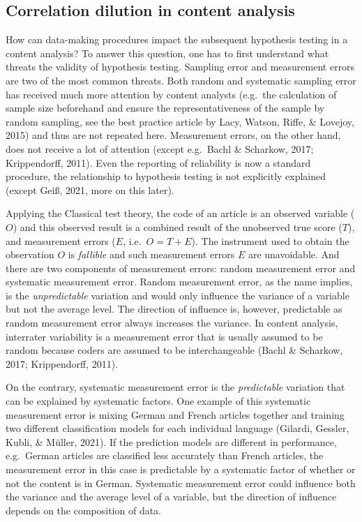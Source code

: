 \documentclass[english,man,floatsintext]{apa6}
\begin{document}
\hypertarget{correlation-dilution-in-content-analysis}{%
\subsection{Correlation dilution in content analysis}\label{correlation-dilution-in-content-analysis}}

How can data-making procedures impact the subsequent hypothesis testing in a content analysis? To answer this question, one has to first understand what threats the validity of hypothesis testing. Sampling error and measurement errors are two of the most common threats. Both random and systematic sampling error has received much more attention by content analysts (e.g.~the calculation of sample size beforehand and ensure the representativeness of the sample by random sampling, see the best practice article by Lacy, Watson, Riffe, \& Lovejoy, 2015) and thus are not repeated here. Measurement errors, on the other hand, does not receive a lot of attention (except e.g.~Bachl \& Scharkow, 2017; Krippendorff, 2011). Even the reporting of reliability is now a standard procedure, the relationship to hypothesis testing is not explicitly explained (except Geiß, 2021, more on this later).

Applying the Classical test theory, the code of an article is an observed variable (\(O\)) and this observed result is a combined result of the unobserved true score (\(T\)), and measurement errors (\(E\), i.e.~\(O = T + E\)). The instrument used to obtain the observation \(O\) is \emph{fallible} and such measurement errors \(E\) are unavoidable. And there are two components of measurement errors: random measurement error and systematic measurement error. Random measurement error, as the name implies, is the \emph{unpredictable} variation and would only influence the variance of a variable but not the average level. The direction of influence is, however, predictable as random measurement error always increases the variance. In content analysis, interrater variability is a measurement error that is usually assumed to be random because coders are assumed to be interchangeable (Bachl \& Scharkow, 2017; Krippendorff, 2011).

On the contrary, systematic measurement error is the \emph{predictable} variation that can be explained by systematic factors. One example of this systematic measurement error is mixing German and French articles together and training two different classification models for each individual language (Gilardi, Gessler, Kubli, \& Müller, 2021). If the prediction models are different in performance, e.g.~German articles are classified less accurately than French articles, the measurement error in this case is predictable by a systematic factor of whether or not the content is in German. Systematic measurement error could influence both the variance and the average level of a variable, but the direction of influence depends on the composition of data.
\end{document}
